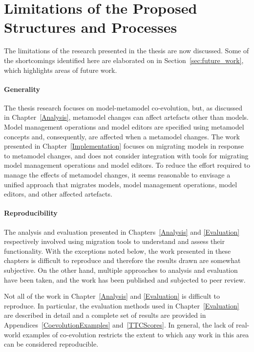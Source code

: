 
\section{Limitations of the Proposed Structures and Processes}
\label{sec:limitations}
The limitations of the research presented in the thesis are now discussed. Some of the shortcomings identified here are elaborated on in Section~\ref{sec:future_work}, which highlights areas of future work.

\paragraph{Generality} The thesis research focuses on model-metamodel co-evolution, but, as discussed in Chapter~\ref{Analysis}, metamodel changes can affect artefacts other than models. Model management operations and model editors are specified using metamodel concepts and, consequently, are affected when a metamodel changes. The work presented in Chapter~\ref{Implementation} focuses on migrating models in response to metamodel changes, and does not consider integration with tools for migrating model management operations and model editors. To reduce the effort required to manage the effects of metamodel changes, it seems reasonable to envisage a unified approach that migrates models, model management operations, model editors, and other affected artefacts.

\paragraph{Reproducibility} The analysis and evaluation presented in Chapters~\ref{Analysis} and \ref{Evaluation} respectively involved using migration tools to understand and assess their functionality. With the exceptions noted below, the work presented in these chapters is difficult to reproduce and therefore the results drawn are somewhat subjective. On the other hand, multiple approaches to analysis and evaluation have been taken, and the work has been published and subjected to peer review. 

Not all of the work in Chapter~\ref{Analysis} and \ref{Evaluation} is difficult to reproduce. In particular, the evaluation methods used in Chapter~\ref{Evaluation} are described in detail and a complete set of results are provided in Appendices~\ref{CoevolutionExamples} and~\ref{TTCScores}. In general, the lack of real-world examples of co-evolution restricts the extent to which any work in this area can be considered reproducible. 


